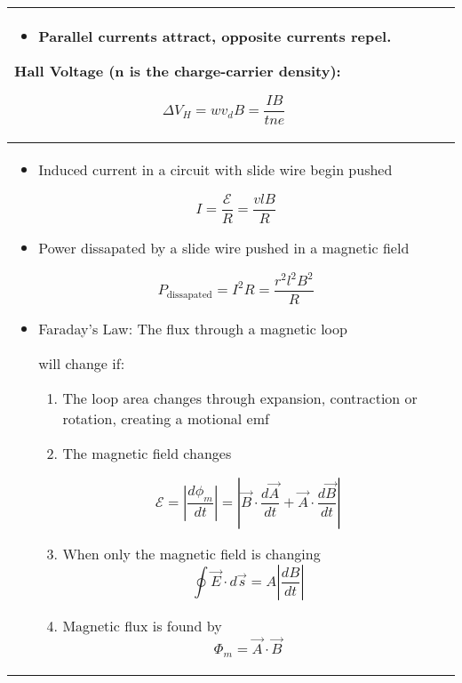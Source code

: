 \documentclass{article}
\begin{document}
\begin{center}
\begin{longtable}{|p{9cm}|p{9cm}|}
\begin{itemize}
			      \[ f_{cyc} = \frac{qB}{2\pi m}, r_{cyc} = \frac{mv}{qB}\]

			\item Parallel currents attract, opposite currents repel.

		\end{itemize}



		Hall Voltage (n is the charge-carrier density):

		\[ \Delta V_H = wv_dB = \frac{IB}{tne}\]                                                                  \\

		\hline



		\begin{itemize}

			\item Induced current in a circuit with slide wire begin pushed



			      \[ I = \frac{\mathcal{E}}{R} = \frac{vlB}{R} \]



			\item Power dissapated by a slide wire pushed in a magnetic field

			      \[ P_\text{dissapated} = I^2 R = \frac{r^2 l^2 B^2}{R} \]

			\item Faraday's Law: The flux through a magnetic loop

			      will change if:



			      \begin{enumerate}

				      \item The loop area changes through expansion, contraction or rotation, creating a motional emf

				      \item The magnetic field changes

				            \[\mathcal{E} = \left\lvert \frac{d\phi_m}{dt}\right\rvert = \left\lvert \vec{B} \cdot \frac{d\vec{A}}{dt} + \vec{A} \cdot \frac{d\vec{B}}{dt}\right\rvert\]

				      \item When only the magnetic field is changing\[ \oint \vec{E} \cdot d\vec{s} = A\left\lvert \frac{dB}{dt}\right\rvert\]

				      \item Magnetic flux is found by\[ \Phi_m = \vec{A}\cdot\vec{B}\]


\end{enumerate}
\end{itemize}
\end{longtable}
\end{center}
\end{document}
